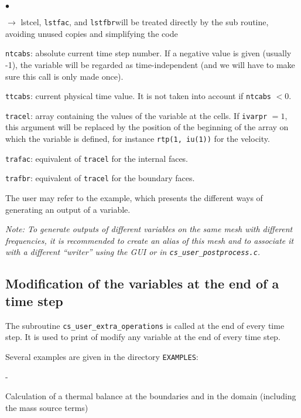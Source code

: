 {{{\begin{list}{$\bullet$}{}
\begin{list}{$\rightarrow$}{}
{lstcel}, \texttt{lstfac}, and \texttt{lstfbr}will be treated directly by
 the sub routine, avoiding unused copies and simplifying the code
         \end{list}
       \item \texttt{ntcabs}: absolute current time step number. If a
             negative value is given (usually -1), the variable will be
             regarded  as time-independent (and we will have to make sure this
             call is only made once).
       \item \texttt{ttcabs}: current physical time value. It is not taken
             into account if \texttt{ntcabs} $< 0$.
       \item \texttt{tracel}: array containing the values of the
             variable at the cells. If \texttt{ivarpr} $= 1$, this
             argument will be replaced by the position of the beginning
             of the array on which the variable is defined, for instance
             \texttt{rtp(1, iu(1))} for the velocity.
       \item \texttt{trafac}: equivalent of \texttt{tracel} for the
             internal faces.
       \item \texttt{trafbr}: equivalent of \texttt{tracel} for the
             boundary faces.
\end{list}

The user may refer to the example, which presents the different ways of
generating an output of a variable.

{\em Note: To
generate outputs of different variables on the same mesh with different
frequencies, it is recommended to create an alias of this mesh and to
associate it with a different ``writer'' using the GUI or in
\texttt{cs\_user\_postprocess.c}.}

\subsection{Modification of the variables at the end of a time step}

The subroutine \texttt{cs\_user\_extra\_operations} is called at the end
of every time step. It is used to print of modify any variable at the end
of every time step.

Several examples are given in the directory \texttt{EXAMPLES}:
\begin{list}{-}{}
\item Calculation of a thermal balance at  the boundaries and in the
      domain (including the mass source terms)


\end{list}}}}
